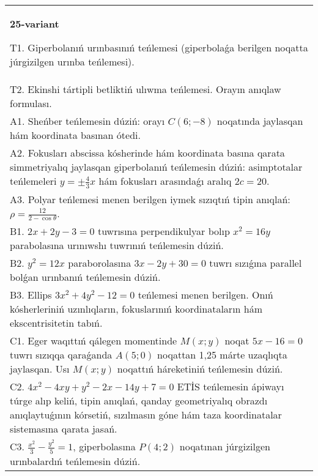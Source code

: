 \documentclass{article}
\begin{document}
\begin{tabular}{m{17cm}}
\textbf{25-variant}
\newline

T1. Giperbolanıń urınbasınıń teńlemesi (giperbolaǵa berilgen noqatta júrgizilgen urınba teńlemesi).\\

T2. Ekinshi tártipli betliktiń ulıwma teńlemesi. Orayın anıqlaw formulası.\\

A1. Sheńber teńlemesin dúziń: orayı $C (6 ;-8) $ noqatında jaylasqan hám koordinata basınan ótedi.\\

A2. Fokusları abscissa kósherinde hám koordinata basına qarata simmetriyalıq jaylasqan giperbolanıń teńlemesin dúziń: asimptotalar teńlemeleri $y=\pm \frac{4}{3}x$ hám fokusları arasındaǵı aralıq $2 c=20$.\\

A3. Polyar teńlemesi menen berilgen iymek sızıqtıń tipin anıqlań: $\rho=\frac{12}{2-\cos\theta}$.\\

B1. $2x + 2y - 3 = 0$ tuwrısına perpendikulyar bolıp $x^{2} = 16y$ parabolasına urınıwshı tuwrınıń teńlemesin dúziń.  \\

B2. $y^{2} = 12x$ paraborolasına $3x - 2y + 30 = 0$ tuwrı sızıǵına parallel bolǵan urınbanıń teńlemesin dúziń.  \\

B3. Ellips $3x^{2} + 4y^{2} - 12 = 0$ teńlemesi menen berilgen. Onıń kósherleriniń uzınlıqların, fokuslarınıń koordinataların hám ekscentrisitetin tabıń.  \\

C1. Eger waqıttıń qálegen momentinde $M(x;y)$ noqat $5x - 16 = 0$ tuwrı sızıqqa qaraǵanda $A(5;0)$ noqattan 1,25 márte uzaqlıqta jaylasqan. Usı $M(x;y)$ noqattıń háreketiniń teńlemesin dúziń.  \\

C2. $4x^{2} - 4xy + y^{2} - 2x - 14y + 7 = 0$ ETİS teńlemesin ápiwayı túrge alıp keliń, tipin anıqlań, qanday geometriyalıq obrazdı anıqlaytuǵının kórsetiń, sızılmasın góne hám taza koordinatalar sistemasına qarata jasań.  \\

C3. $\frac{x^{2}}{3} - \frac{y^{2}}{5} = 1$, giperbolasına $P(4;2)$ noqatınan júrgizilgen urınbalardıń teńlemesin dúziń.  \\

\end{tabular}
\vspace{1cm}
\end{document}
